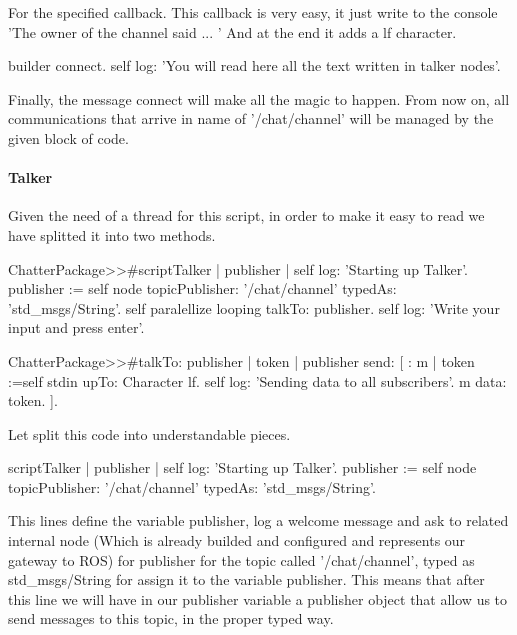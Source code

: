 \documentclass[a4paper,10pt,twoside]{book}
\begin{document}
				For the specified callback. This callback is very easy, it just write to the console 'The owner of the channel said ... ' And at the end it adds a lf character.
			
			\begin{code}
				builder connect.
				self log: 'You will read here all the text written in talker nodes'.
			\end{code}
			
				Finally, the message connect will make all the magic to happen.
				From now on, all communications that arrive in name of '/chat/channel' will be managed by the given block of code.  
			
			
			\paragraph{Talker\newline\newline}
			
				Given the need of a thread for this script, in order to make it easy to read we have splitted it into two methods.
				
			\begin{code}
			ChatterPackage>>#scriptTalker
				| publisher |
				self log: 'Starting up Talker'.
				publisher := self node topicPublisher: '/chat/channel' typedAs: 'std_msgs/String'.
				self paralellize looping talkTo: publisher.
				self log: 'Write your input and press enter'.
				
			ChatterPackage>>#talkTo: publisher
				| token |
				publisher send: [ : m | 
					token :=self stdin upTo: Character lf.
					self log: 'Sending data to all subscribers'.
					m data: token. 
				].	
			\end{code}
			
			Let split this code into understandable pieces. 
			
			\begin{code}
			scriptTalker
				| publisher |
				self log: 'Starting up Talker'.
				publisher := self node topicPublisher: '/chat/channel' typedAs: 'std_msgs/String'.
			\end{code}
			
				This lines define the variable publisher, log a welcome message and ask to related internal node (Which is already builded and configured and represents our gateway to ROS) for publisher for the topic called '/chat/channel', typed as std\_msgs/String for assign it to the variable publisher. 
				This means that after this line we will have in our publisher variable a publisher object that allow us to send messages to this topic, in the proper typed way.
				
\end{document}
